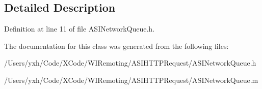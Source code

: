\subsection{Detailed Description}


Definition at line 11 of file ASINetworkQueue.h.

The documentation for this class was generated from the following files:\begin{DoxyCompactItemize}
\item 
/Users/yxh/Code/XCode/WIRemoting/ASIHTTPRequest/ASINetworkQueue.h\item 
/Users/yxh/Code/XCode/WIRemoting/ASIHTTPRequest/ASINetworkQueue.m\end{DoxyCompactItemize}
